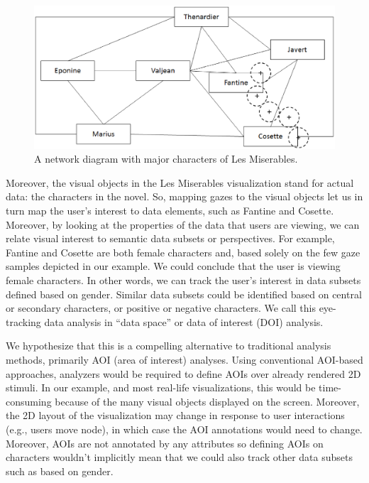 \begin{figure}[htb]
  \centering
  \includegraphics[width=0.99\linewidth]{images/MiserablesSimple.eps}
  \caption{A network diagram with major characters of Les Miserables.}
    \label{fig:MiserablesSimple}
\end{figure}

Moreover, the visual objects in the Les Miserables visualization stand for actual data: the characters in the novel. So, mapping gazes to the visual objects let us in turn map the user's interest to data elements, such as Fantine and Cosette. Moreover, by looking at the properties of the data that users are viewing, we can relate visual interest to semantic data subsets or perspectives. For example, Fantine and Cosette are both female characters and, based solely on the few gaze samples depicted in our example. We could conclude that the user is viewing female characters. In other words, we can track the user's interest in data subsets defined based on gender. Similar data subsets could be identified based on central or secondary characters, or positive or negative characters. We call this eye-tracking data analysis in ``data space'' or data of interest (DOI) analysis.

We hypothesize that this is a compelling alternative to traditional analysis methods, primarily AOI (area of interest) analyses. Using conventional AOI-based approaches, analyzers would be required to define AOIs over already rendered 2D stimuli. In our example, and most real-life visualizations, this would be time-consuming because of the many visual objects displayed on the screen. Moreover, the 2D layout of the visualization may change in response to user interactions (e.g., users move node), in which case the AOI annotations would need to change. Moreover, AOIs are not annotated by any attributes so defining AOIs on characters wouldn't implicitly mean that we could also track other data subsets such as based on gender.  

